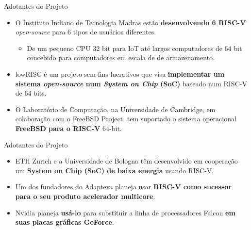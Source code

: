 \documentclass[red, aspectratio=169, xcolor=dvipsnames]{beamer}
\let\olditem=\item%
\renewcommand{\item}{\olditem \justifying}
\begin{document}
\begin{frame}{Adotantes do Projeto}
	\begin{itemize}
		\setlength{\itemsep}{1.5em}

		\item O Instituto Indiano de Tecnologia Madras estão \textbf{desenvolvendo 6 RISC-V} \textit{open-source} para 6 tipos de usuários diferentes.
		\begin{itemize}
			\item De um pequeno CPU 32 bit para IoT até largos computadores de 64 bit concebido para computadores em escala de de armazenamento.
		\end{itemize}

		\item lowRISC é um projeto sem fins lucrativos que visa \textbf{implementar um sistema \textit{open-source} num \textit{System on Chip} (SoC)} baseado num RISC-V de 64 bits.

		\item O Laboratório de Computação, na Universidade de Cambridge, em colaboração com o FreeBSD Project, tem suportado o sistema operacional \textbf{FreeBSD para o RISC-V} 64-bit.
	\end{itemize}
\end{frame}

\begin{frame}{Adotantes do Projeto}
	\begin{itemize}
		\setlength{\itemsep}{1.5em}

		\item ETH Zurich e a Universidade de Bologna têm desenvolvido em cooperação um \textbf{System on Chip (SoC) de baixa energia} usando RISC-V.

		\item Um dos fundadores do Adapteva planeja usar \textbf{RISC-V como sucessor para o seu produto acelerador multicore}.

		\item Nvidia planeja \textbf{usá-lo} para substituir a linha de processadores Falcon \textbf{em suas placas gráficas GeForce}.
	\end{itemize}
\end{frame}
\end{document}
